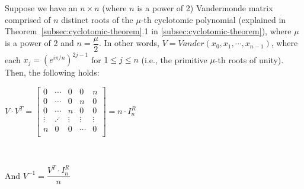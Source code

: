 \begin{tcolorbox}[title={\textbf{\tboxtheorem{\ref*{subsec:vandermonde-euler}} Vandermonde Matrix with the Roots of  \text{(power-of-2)}-th Cyclotomic Polynomial over Complex Numbers}}]

Suppose we have an $n \times n$ (where $n$ is a power of 2) Vandermonde matrix comprised of $n$ distinct roots of the $\mu$-th cyclotomic polynomial (explained in Theorem~\ref*{subsec:cyclotomic-theorem}.1 in \autoref{subsec:cyclotomic-theorem}), where $\mu$ is a power of 2 and $n = \dfrac{\mu}{2}$. In other words, $V = \mathit{Vander}(x_0, x_1, \cdots, x_{n-1})$, where each $x_j = (e^{i\pi/n})^{2j-1}$ for $1 \leq j \leq n$ (i.e., the primitive $\mu$-th roots of unity). Then, the following holds:

$V \cdot V^T = \begin{bmatrix}
0 & \cdots & 0 & 0 & n\\
0 & \cdots & 0 & n & 0\\
0 & \cdots & n & 0 & 0\\
\vdots & \iddots & \vdots & \vdots & \vdots \\
n & 0 & 0 & \cdots & 0\\
\end{bmatrix} = n \cdot I^R_n$

$ $

And $V^{-1} = \dfrac{V^T \cdot I_n^R}{n}$


\end{tcolorbox}


